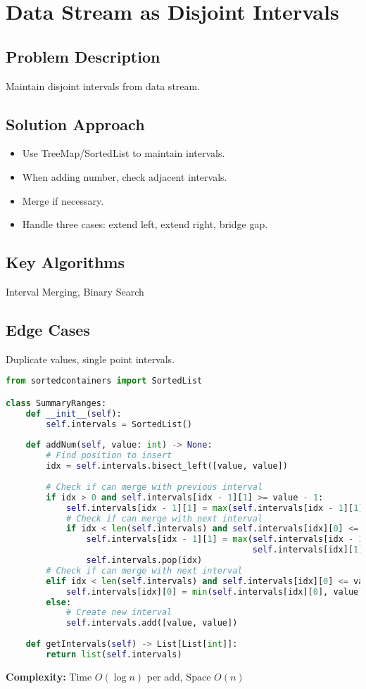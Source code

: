 \documentclass[10pt, a4paper]{article}
\begin{document}
\section{Data Stream as Disjoint Intervals}
\subsection*{Problem Description}
Maintain disjoint intervals from data stream.

\subsection*{Solution Approach}
\begin{itemize}
    \item Use TreeMap/SortedList to maintain intervals.
    \item When adding number, check adjacent intervals.
    \item Merge if necessary.
    \item Handle three cases: extend left, extend right, bridge gap.
\end{itemize}

\subsection*{Key Algorithms}
Interval Merging, Binary Search

\subsection*{Edge Cases}
Duplicate values, single point intervals.

\begin{lstlisting}[language=Python]
from sortedcontainers import SortedList

class SummaryRanges:
    def __init__(self):
        self.intervals = SortedList()
    
    def addNum(self, value: int) -> None:
        # Find position to insert
        idx = self.intervals.bisect_left([value, value])
        
        # Check if can merge with previous interval
        if idx > 0 and self.intervals[idx - 1][1] >= value - 1:
            self.intervals[idx - 1][1] = max(self.intervals[idx - 1][1], value)
            # Check if can merge with next interval
            if idx < len(self.intervals) and self.intervals[idx][0] <= value + 1:
                self.intervals[idx - 1][1] = max(self.intervals[idx - 1][1], 
                                                 self.intervals[idx][1])
                self.intervals.pop(idx)
        # Check if can merge with next interval
        elif idx < len(self.intervals) and self.intervals[idx][0] <= value + 1:
            self.intervals[idx][0] = min(self.intervals[idx][0], value)
        else:
            # Create new interval
            self.intervals.add([value, value])
    
    def getIntervals(self) -> List[List[int]]:
        return list(self.intervals)
\end{lstlisting}
\textbf{Complexity:} Time $O(\log n)$ per add, Space $O(n)$
\end{document}
